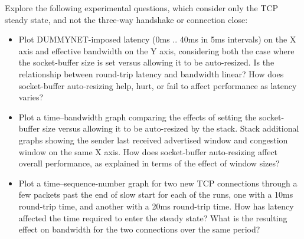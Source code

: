 \documentclass[a4paper,10pt]{article}
\begin{document}
\noindent
Explore the following experimental questions, which consider only the TCP
steady state, and not the three-way handshake or connection close:

\begin{itemize}
  \item Plot DUMMYNET-imposed latency (0ms .. 40ms in 5ms intervals) on the X
    axis and effective bandwidth on the Y axis, considering both the case
    where the socket-buffer size is set versus allowing it to be auto-resized.
    Is the relationship between round-trip latency and bandwidth linear?
    How does socket-buffer auto-resizing help, hurt, or fail to affect
    performance as latency varies?

  \item Plot a time--bandwidth graph comparing the effects of setting the
    socket-buffer size versus allowing it to be auto-resized by the stack.
    Stack additional graphs showing the sender last received advertised window
    and congestion window on the same X axis.
    How does socket-buffer auto-resizing affect overall performance, as
    explained in terms of the effect of window sizes?

  \item Plot a time--sequence-number graph for two new TCP connections through
    a few packets past the end of slow start for each of the runs, one with a
    10ms round-trip time, and another with a 20ms round-trip time.
    How has latency affected the time required to enter the steady state?
    What is the resulting effect on bandwidth for the two connections over the
    same period?
\end{itemize}
\end{document}
